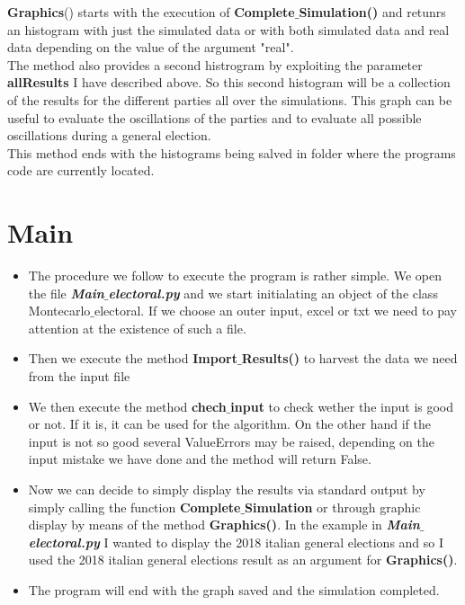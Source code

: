 \documentclass[12pt,a4paper,openright]{report}
\begin{document}
\begin{itemize}
\textbf{Graphics}() starts with the execution of \textbf{Complete$\_$Simulation()} and retunrs an histogram with just the simulated data or with both simulated data and real data depending on the value of the argument "real".\\
The method also provides a second histrogram by exploiting the parameter \textbf{allResults} I have described above. So this second histogram will be a collection of the results for the different parties all over the simulations. This graph can be useful to evaluate the oscillations of the parties and to evaluate all possible oscillations during a general election.\\
This method ends with the histograms being salved in folder where the programs code are currently located.
\end{itemize}
\section*{Main}
\begin{itemize}
\item
The procedure we follow to execute the program is rather simple. We open the file  \textit{\textbf{Main$\_$electoral.py}} and we start initialating an object of the class Montecarlo$\_$electoral. If we choose an outer input, excel or txt we need to pay attention at the existence of such a file.
\item
Then we execute the method \textbf{Import$\_$Results()} to harvest the data we need from the input file
\item
We then execute the method \textbf{chech$\_$input} to check wether the input is good or not. If it is, it can be used for the algorithm. On the other hand if the input is not so good several ValueErrors may be raised, depending on the input mistake we have done and the method will return False.
\item
Now we can decide to simply display the results via standard output by simply calling the function \textbf{Complete$\_$Simulation} or through graphic display by means of the method \textbf{Graphics()}. In the example in \textit{\textbf{Main$\_$electoral.py}} I wanted to display the 2018 italian general elections and so I used the 2018 italian general elections result as an argument for \textbf{Graphics()}.
\item
The program will end with the graph saved and the simulation completed.

\end{itemize}
\end{document}
